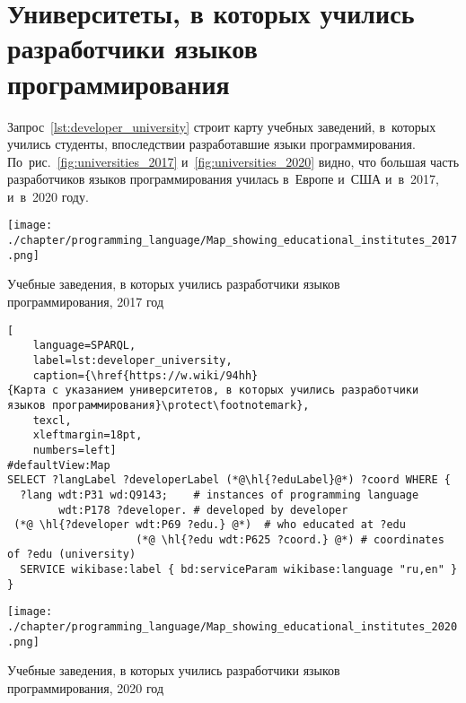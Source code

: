 \section{Университеты, в которых учились разработчики языков программирования}

Запрос~\ref{lst:developer_university} строит карту учебных заведений, 
в~которых учились студенты, впоследствии разработавшие языки программирования. 
По~рис.~\ref{fig:universities_2017} и~\ref{fig:universities_2020} видно, 
что большая часть разработчиков языков программирования училась в~Европе и~США и~в~2017, и~в~2020 году.
%
\begin{marginfigure}[3\baselineskip]
\centering
	\texttt{[image: ./chapter/programming\_language/Map\_showing\_educational\_institutes\_2017.png]}
    \vspace{-12pt}
	\caption[Учебные заведения, в которых учились разработчики языков программирования, 2017 год.]
    {Учебные заведения, в которых учились разработчики языков\\программирования, 2017 год}
	\label{fig:universities_2017}
\end{marginfigure}


\begin{lstlisting}[
    language=SPARQL,
    label=lst:developer_university,
    caption={\href{https://w.wiki/94hh}
{Карта с указанием университетов, в которых учились разработчики языков программирования}\protect\footnotemark},
    texcl,
    xleftmargin=18pt,
    numbers=left]
#defaultView:Map
SELECT ?langLabel ?developerLabel (*@\hl{?eduLabel}@*) ?coord WHERE {
  ?lang wdt:P31 wd:Q9143;    # instances of programming language
        wdt:P178 ?developer. # developed by developer
 (*@ \hl{?developer wdt:P69 ?edu.} @*)  # who educated at ?edu
                    (*@ \hl{?edu wdt:P625 ?coord.} @*) # coordinates of ?edu (university)
  SERVICE wikibase:label { bd:serviceParam wikibase:language "ru,en" }
}
\end{lstlisting}


\begin{marginfigure}[1\baselineskip]
\centering
	\texttt{[image: ./chapter/programming\_language/Map\_showing\_educational\_institutes\_2020.png]}
    \vspace{-12pt}
	\caption[Учебные заведения, в которых учились разработчики языков программирования, 2020 год.]
    {Учебные заведения, в которых учились разработчики языков\\программирования, 2020 год}
	\label{fig:universities_2020}
\end{marginfigure}


